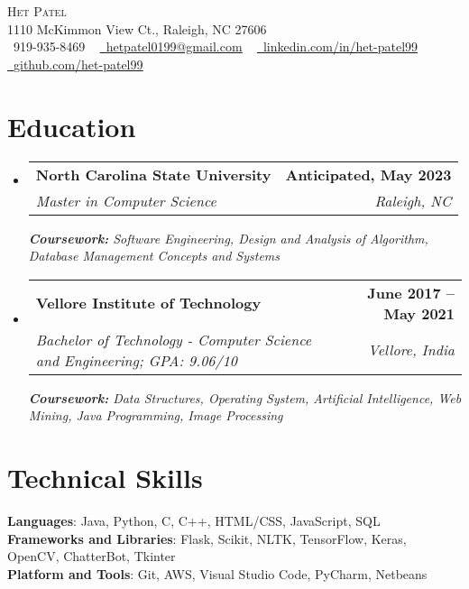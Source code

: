 \documentclass[letterpaper,11pt]{article}
\makeatletter
\newcommand{\resumeSubheading}[4]{
  \vspace{-2pt}\item
    \begin{tabular*}{1.0\textwidth}[t]{l@{\extracolsep{\fill}}r}
      \textbf{#1} & \textbf{\small #2} \\
      \textit{\small#3} & \textit{\small #4} \\
    \end{tabular*}\vspace{-7pt}
}
\newcommand{\resumeSubHeadingListStart}{\begin{itemize}[leftmargin=0.0in, label={}]}
\newcommand{\resumeSubHeadingListEnd}{\end{itemize}}
\makeatother
\begin{document}
\begin{center}
    {\Huge \scshape Het Patel} \\ \vspace{1pt}
    1110 McKimmon View Ct., Raleigh, NC 27606 \\ \vspace{1pt}
    \small \raisebox{-0.1\height}\faPhone\ 919-935-8469 ~ \href{mailto:x@gmail.com}{\raisebox{-0.2\height}\faEnvelope\  \underline{hetpatel0199@gmail.com}} ~ 
    \href{https://linkedin.com/in//}{\raisebox{-0.2\height}\faLinkedin\ \underline{linkedin.com/in/het-patel99}}  ~
    \href{https://github.com/}{\raisebox{-0.2\height}\faGithub\ \underline{github.com/het-patel99}}
    \vspace{-8pt}
\end{center}


\section{Education}
  \resumeSubHeadingListStart
    \resumeSubheading
      {North Carolina State University}{Anticipated, May 2023}
      {Master in Computer Science}{Raleigh, NC}
      {\scriptsize \textit{ \footnotesize{\newline{}\textbf{Coursework:} Software Engineering, Design and Analysis of Algorithm, Database Management Concepts and Systems}}}
  \resumeSubHeadingListEnd
  \vspace{-15pt}
  \resumeSubHeadingListStart
    \resumeSubheading
      {Vellore Institute of Technology}{June 2017 -- May 2021}
      {Bachelor of Technology - Computer Science and Engineering; GPA: 9.06/10}{Vellore, India}
      {\scriptsize \textit{ \footnotesize{\newline{}\textbf{Coursework:} Data Structures, Operating System, Artificial Intelligence, Web Mining, Java Programming, Image Processing}}}
  \resumeSubHeadingListEnd
\vspace{-18pt}
\section{Technical Skills}
 \begin{itemize}[leftmargin=0.15in, label={}]
    \small{\item{
     \textbf{Languages}{: Java, Python, C, C++, HTML/CSS, JavaScript, SQL} \\
     \textbf{Frameworks and Libraries}{: Flask, Scikit, NLTK, TensorFlow, Keras, OpenCV, ChatterBot, Tkinter} \\
     \textbf{Platform and Tools}{: Git, AWS, Visual Studio Code, PyCharm, Netbeans} \\
    }}
 \end{itemize}
 \vspace{-18pt}
\end{document}
